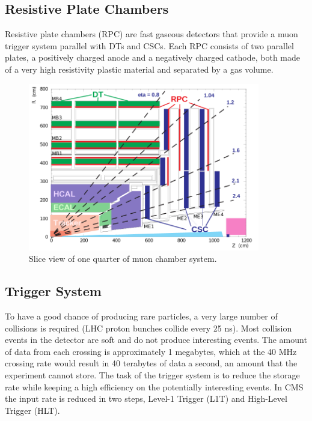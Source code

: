 \subsection*{Resistive Plate Chambers}
Resistive plate chambers (RPC) are fast gaseous detectors that provide a muon trigger system parallel with DTs and CSCs. Each RPC consists of two parallel plates, a positively charged anode and a negatively charged cathode, both made of a very high resistivity plastic material and separated by a gas volume.

\begin{figure}[hbtp]
  \begin{center}
    \includegraphics[width=0.9\textwidth]{figure/CH2/MuonSys.png}
  \end{center}
  \caption{\label{fig:MuonSys}Slice view of one quarter of muon chamber system.}
\end{figure}

\subsection{Trigger System}

To have a good chance of producing rare particles, a very large number of collisions is required (LHC proton bunches collide every 25 ns). Most collision events in the detector are soft and do not produce interesting events. The amount of data from each crossing is approximately 1 megabytes, which at the 40 MHz crossing rate would result in 40 terabytes of data a second, an amount that the experiment cannot store. The task of the trigger system is to reduce the storage rate while keeping a high efficiency on the potentially interesting events. In CMS the input rate is reduced in two steps, Level-1 Trigger (L1T) and High-Level Trigger (HLT).

